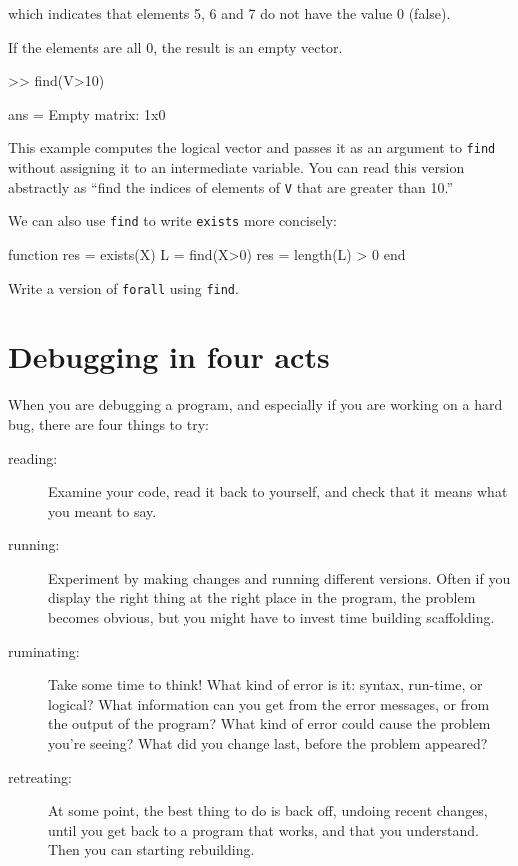 \documentclass[
]{book}
\numberwithin{Answer}{chapter}
\numberwithin{Exercise}{chapter}
\begin{document}
which indicates that elements 5, 6 and 7 do not have the value 0 (false).

If the elements are all 0, the result is an empty vector.

\begin{code}
>> find(V>10)

ans = Empty matrix: 1x0
\end{code}

This example computes the logical vector and passes it as an
argument to {\tt find} without assigning it to an intermediate
variable.  You can read this version abstractly as ``find
the indices of elements of {\tt V} that are greater than 10.''

We can also use {\tt find} to write {\tt exists} more concisely:

\begin{code}
function res = exists(X)
    L = find(X>0)
    res = length(L) > 0
end
\end{code}

\begin{ex}
Write a version of {\tt forall} using {\tt find}.
\end{ex}


\section{Debugging in four acts}


When you are debugging a program, and especially if you are working on a hard bug, there are four things to try:

\begin{description}

\item[reading:] Examine your code, read it back to yourself, and
check that it means what you meant to say.

\item[running:] Experiment by making changes and running different
versions.  Often if you display the right thing at the right place
in the program, the problem becomes obvious, but you might have to invest time building scaffolding.

\item[ruminating:] Take some time to think!  What kind of error
is it: syntax, run-time, or logical?  What information can you get from
the error messages, or from the output of the program?  What kind of
error could cause the problem you're seeing?  What did you change
last, before the problem appeared?

\item[retreating:] At some point, the best thing to do is back
off, undoing recent changes, until you get back to a program that
works, and that you understand.  Then you can starting rebuilding.

\end{description}
\end{document}
